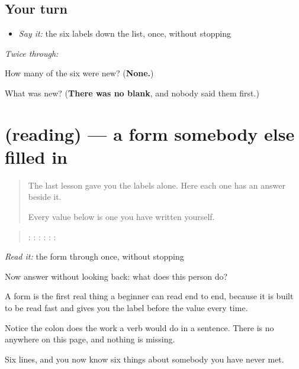 \subsection*{Your turn}
\begin{itemize}
\raggedright
  \item \emph{Say it:} the six labels down the list, once, without stopping
\end{itemize}

\emph{Twice through:}

\begin{tcolorbox}[breakable,colback=teal!4,colframe=teal!35!black,title={Before you move on}]
How many of the six were new? (\textbf{None.})

What was new? (\textbf{There was no blank}, and nobody said them first.)
\end{tcolorbox}
\section[(reading)]{(reading) — a form somebody else filled in}

\label{lesson:PA-C45-form}



\begin{quote}
The last lesson gave you the labels alone. Here each one has an answer beside it.

Every value below is one you have written yourself.
\end{quote}

\begin{tcolorbox}[breakable,skin=enhanced,colback=orange!6,colframe=orange!45!black,boxrule=0.5pt,arc=1mm,left=6pt,right=6pt,top=4pt,bottom=4pt,fonttitle=\bfseries,title={Read this}]
\begin{quote}
:  :  :  :  :  :  
\end{quote}

\emph{Read it:} the form through once, without stopping

Now answer without looking back: what does this person do?
\end{tcolorbox}

\begin{grammarlens}[title={What you've built}]
A form is the first real thing a beginner can read end to end, because it is built to be read fast and gives you the label before the value every time.

Notice the colon does the work a verb would do in a sentence. There is no \textbf{} anywhere on this page, and nothing is missing.

Six lines, and you now know six things about somebody you have never met.
\end{grammarlens}

